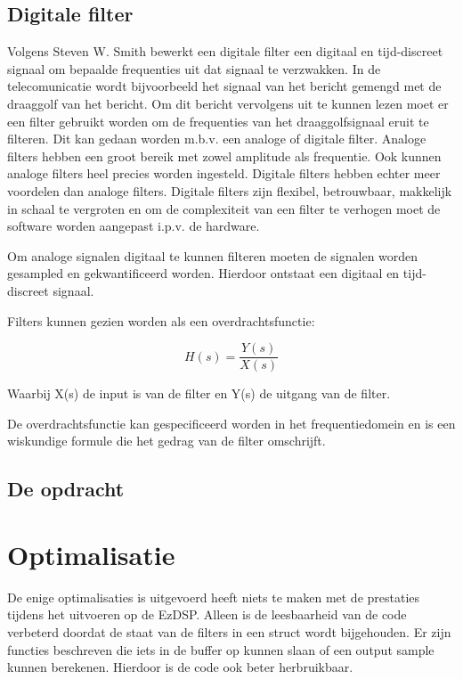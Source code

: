 \documentclass[11pt,a4paper]{article}
\begin{document}
		\subsection{Digitale filter}
		Volgens Steven W. Smith \cite{DSPguide} bewerkt een digitale filter een digitaal en tijd-discreet signaal om bepaalde frequenties uit dat signaal te verzwakken. In de telecomunicatie wordt bijvoorbeeld het signaal van het bericht gemengd met de draaggolf van het bericht. Om dit bericht vervolgens uit te kunnen lezen moet er een filter gebruikt worden om de frequenties van het draaggolfsignaal eruit te filteren. Dit kan gedaan worden m.b.v. een analoge of digitale filter. Analoge filters hebben een groot bereik met zowel amplitude als frequentie. Ook kunnen analoge filters heel precies worden ingesteld. Digitale filters hebben echter meer voordelen dan analoge filters. Digitale filters zijn flexibel, betrouwbaar, makkelijk in schaal te vergroten en om de complexiteit van een filter te verhogen moet de software worden aangepast i.p.v. de hardware. 
		
Om analoge signalen digitaal te kunnen filteren moeten de signalen worden gesampled en gekwantificeerd worden. Hierdoor ontstaat een digitaal en tijd-discreet signaal. 

Filters kunnen gezien worden als een overdrachtsfunctie:
 
\[
    H(s) = \frac{Y(s)}{X(s)}
\]	

Waarbij X(s) de input is van de filter en Y(s) de uitgang van de filter. 

De overdrachtsfunctie kan gespecificeerd worden in het frequentiedomein en is een wiskundige formule die het gedrag van de filter omschrijft.  

		
	\subsection{De opdracht}		
		
	
	

	\section{Optimalisatie}
	De enige optimalisaties is uitgevoerd heeft niets te maken met de prestaties tijdens het uitvoeren op de EzDSP. Alleen is de leesbaarheid van de code verbeterd doordat de staat van de filters in een struct wordt bijgehouden. Er zijn functies beschreven die iets in de buffer op kunnen slaan of een output sample kunnen berekenen. Hierdoor is de code ook beter herbruikbaar. 
	
\end{document}
